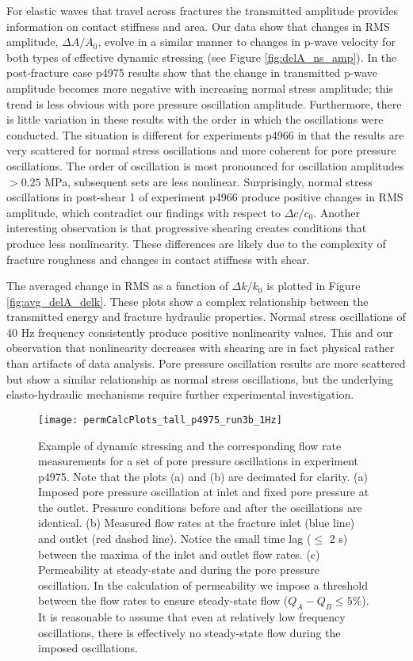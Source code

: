 \documentclass[draft,jgrga]{agutexSI2019}
\begin{document}
\begin{article}
For elastic waves that travel across fractures the transmitted amplitude provides information on contact stiffness and area. Our data show that changes in RMS amplitude, $ \Delta A/ A_0 $, evolve in a similar manner to changes in p-wave velocity for both types of effective dynamic stressing (see Figure \ref{fig:delA_ns_amp}). In the post-fracture case p4975 results show that the change in transmitted p-wave amplitude becomes more negative with increasing normal stress amplitude; this trend is less obvious with pore pressure oscillation amplitude. Furthermore, there is little variation in these results with the order in which the oscillations were conducted. The situation is different for experiments p4966 in that the results are very scattered for normal stress oscillations and more coherent for pore pressure oscillations. The order of oscillation is most pronounced for oscillation amplitudes $ > 0.25 $ MPa, subsequent sets are less nonlinear. Surprisingly, normal stress oscillations in post-shear 1 of experiment p4966 produce positive changes in RMS amplitude, which contradict our findings with respect to $ \Delta c/c_0 $. Another interesting observation is that progressive shearing creates conditions that produce less nonlinearity. These differences are likely due to the complexity of fracture roughness and changes in contact stiffness with shear.

The averaged change in RMS as a function of $ \Delta k/k_0 $ is plotted in Figure \ref{fig:avg_delA_delk}. These plots show a complex relationship between the transmitted energy and fracture hydraulic properties. Normal stress oscillations of 40 Hz frequency consistently produce positive nonlinearity values. This and our observation that nonlinearity decreases with shearing are in fact physical rather than artifacts of data analysis. Pore pressure oscillation results are more scattered but show a similar relationship as normal stress oscillations, but the underlying elasto-hydraulic mechanisms require further experimental investigation.

\begin{figure*}[ht]
	\centering
	\texttt{[image: permCalcPlots\_tall\_p4975\_run3b\_1Hz]}
	\caption[]{Example of dynamic stressing and the corresponding flow rate measurements for a set of pore pressure oscillations in experiment p4975. Note that the plots (a) and (b) are decimated for clarity. (a) Imposed pore pressure oscillation at inlet and fixed pore pressure at the outlet. Pressure conditions before and after the oscillations are identical. (b) Measured flow rates at the fracture inlet (blue line) and outlet (red dashed line). Notice the small time lag ($\leq$ 2 s) between the maxima of the inlet and outlet flow rates. (c) Permeability at steady-state and during the pore pressure oscillation. In the calculation of permeability we impose a threshold between the flow rates to ensure steady-state flow ($Q_{A} - Q_{B}  \leq 5 \% $). It is reasonable to assume that even at relatively low frequency oscillations, there is effectively no steady-state flow during the imposed oscillations.}
	\label{fig:perm_calc}
\end{figure*}


\end{article}
\end{document}
